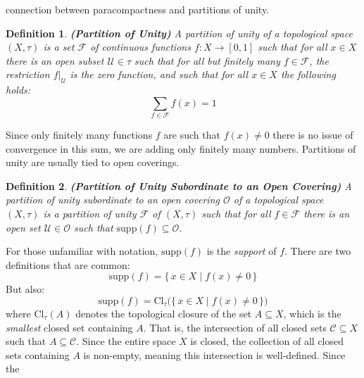 \documentclass{article}
\theoremstyle{plain}
\theoremstyle{normal}
\newtheorem{definition}{Definition}[section]
\begin{document}
        connection between paracompactness and partitions of unity.
        \begin{definition}{\textbf{(Partition of Unity)}}
            A partition of unity of a topological space $(X,\tau)$ is a set
            $\mathcal{F}$ of continuous functions $f:X\rightarrow[0,1]$ such
            that for all $x\in{X}$ there is an open subset $\mathcal{U}\in\tau$
            such that for all but finitely many $f\in\mathcal{F}$, the
            restriction $f|_{\mathcal{U}}$ is the zero function, and such that
            for all $x\in{X}$ the following holds:
            \begin{equation}
                \sum_{f\in\mathcal{F}}f(x)=1
            \end{equation}
        \end{definition}
        Since only finitely many functions $f$ are such that $f(x)\ne{0}$ there
        is no issue of convergence in this sum, we are adding only finitely
        many numbers. Partitions of unity are usually tied to open coverings.
        \begin{definition}%
            {\textbf{(Partition of Unity Subordinate to an Open Covering)}}
            A partition of unity subordinate to an open covering $\mathcal{O}$
            of a topological space $(X,\tau)$ is a partition of unity
            $\mathcal{F}$ of $(X,\tau)$ such that for all $f\in\mathcal{F}$
            there is an open set $\mathcal{U}\in\mathcal{O}$ such that
            $\textrm{supp}(f)\subseteq\mathcal{O}$.
        \end{definition}
        For those unfamiliar with notation, $\textrm{supp}(f)$ is the
        \textit{support} of $f$. There are two definitions that are common:
        \begin{equation}
            \textrm{supp}(f)=\{\,x\in{X}\;|\;f(x)\ne{0}\,\}
        \end{equation}
        But also:
        \begin{equation}
            \textrm{supp}(f)
                =\textrm{Cl}_{\tau}\Big(\{\,x\in{X}\;|\;f(x)\ne{0}\,\}\Big)
        \end{equation}
        where $\textrm{Cl}_{\tau}(A)$ denotes the topological closure of the
        set $A\subseteq{X}$, which is the \textit{smallest} closed set
        containing $A$. That is, the intersection of all closed sets
        $\mathcal{C}\subseteq{X}$ such that $A\subseteq\mathcal{C}$. Since the
        entire space $X$ is closed, the collection of all closed sets containing
        $A$ is non-empty, meaning this intersection is well-defined. Since the
\end{document}
